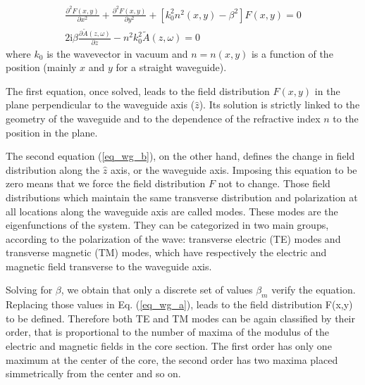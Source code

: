 \documentclass[12pt,a4paper,twoside]{article}
\begin{document}
\begin{subequations}
\begin{align}
	\frac{\partial^2F(x,y)}{\partial x^2} + \frac{\partial^2F(x,y)}{\partial y^2} + \left[ k_0^2n^2(x,y)-\beta^2\right]F(x,y) = 0
	\label{eq_wg_a} \\
	2\mathrm{i}\beta\frac{\partial \tilde{A}(z,\omega)}{\partial z} -n^2k_0^2\tilde{A}(z,\omega) = 0
	\label{eq_wg_b}
\end{align}
\end{subequations}
where $k_0$ is the wavevector in vacuum and $n=n(x,y)$ is a function of the position (mainly $x$ and $y$ for a straight waveguide).

The first equation, once solved, leads to the field distribution $F(x,y)$ in the plane perpendicular to the waveguide axis ($\hat{z}$).
Its solution is strictly linked to the geometry of the waveguide and to the dependence of the refractive index $n$ to the position in the plane.

The second equation (\ref{eq_wg_b}), on the other hand, defines the change in field distribution along the $\hat{z}$ axis, or the waveguide axis.
Imposing this equation to be zero means that we force the field distribution $F$ not to change.
Those field distributions which maintain the same transverse distribution and polarization at all locations along the waveguide axis are called modes.
These modes are the eigenfunctions of the system.
They can be categorized in two main groups, according to the polarization of the wave: transverse electric (TE) modes and transverse magnetic (TM) modes, which have respectively the electric and magnetic field transverse to the waveguide axis.

Solving for $\beta$, we obtain that only a discrete set of values $\beta_m$ verify the equation.
Replacing those values in Eq. (\ref{eq_wg_a}), leads to the field distribution F(x,y) to be defined.
Therefore both TE and TM modes can be again classified by their order, that is proportional to the number of maxima of the modulus of the electric and magnetic fields in the core section.
The first order has only one maximum at the center of the core, the second order has two maxima placed simmetrically from the center and so on.
\end{document}
